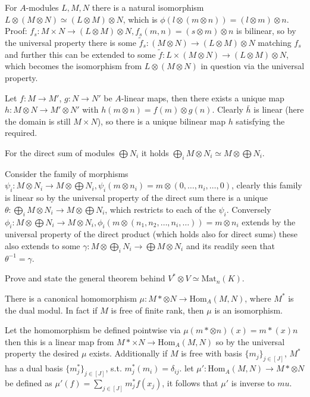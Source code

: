 For \(A\)-modules \(L, M, N\) there is a natural isomorphism
\(L \otimes (M \otimes N) \simeq (L \otimes M) \otimes N\), which is \(\phi(l \otimes (m \otimes n)) = (l \otimes m) \otimes n\).
Proof:
\(f_s : M \times N \to (L \otimes M) \otimes N, f_s(m, n) = (s \otimes m) \otimes n\) is bilinear, so by the universal property there is some
\(\tilde{f}_s : (M \otimes N) \to (L \otimes M) \otimes N\) matching \(f_s\) and further this can be extended to some \(\tilde{f} : L \times (M \otimes N) \to (L \otimes M) \otimes N\), which becomes the isomorphism from \(L \otimes (M \otimes N)\) in question via the universal property.

Let \(f : M \to M'\), \(g : N \to N'\) be \(A\)-linear maps, then there exists a unique map \(h : M \otimes N \to M' \otimes N'\) with \(h(m \otimes n) = f(m) \otimes g(n)\).
Clearly \(\bar{h}\) is linear (here the domain is still \(M \times N\)), so there is a unique bilinear map \(h\) satisfying the required.

For the direct sum of modules \(\bigoplus N_i\) it holds \(\bigoplus_{i} M \otimes N_i \simeq M \otimes \bigoplus N_i\).

Consider the family of morphisms \(\psi_i : M \otimes N_i \to M \otimes \bigoplus N_i, \psi_i (m \otimes n_i) = m \otimes (0, \dots, n_i, \dots, 0)\), clearly this
family is linear so by the universal property of the direct sum there is a unique \(\theta : \bigoplus_{i} M \otimes N_i \to M \otimes \bigoplus N_i\), which restricts to each of the \(\psi_i\). Conversely \(\phi_i : M \otimes \bigoplus N_i \to M \otimes N_i, \phi_i(m \otimes (n_1, n_2, \dots, n_i, \dots)) = m \otimes n_i \) extends
by the universal property of the direct product (which holds also for direct sums) these also extends to some \(\gamma : M \otimes \bigoplus_i N_i \to \bigoplus M \otimes N_i\) and its readily seen that \(\theta^{-1} = \gamma\).



Prove and state the general theorem behind \(V^{*} \otimes V \simeq \text{Mat}_n(K)\).

There is a canonical homomorphism \(\mu : M* \otimes N \to \text{Hom}_A(M, N)\), where \(M^{*}\) is the dual modul.
In fact if \(M\) is free of finite rank, then \(\mu\) is an isomorphism.

Let the homomorphism be defined pointwise via \(\mu(m* \otimes n)(x) = m*(x) n\) then this is a linear map from \(M* \times N \to \text{Hom}_A(M, N)\) so by the universal
property the desired \(\mu\) exists. Additionally if \(M\) is free with basis \(\{m_j\}_{j \in [J]}\), \(M^{*}\) has a dual basis \(\{m^{*}_j\}_{j \in [J]}\), s.t.
\(m^{*}_j(m_i) = \delta_{ij}\). let \(\mu' : \text{Hom}_A(M, N) \to M* \otimes N\) be defined as \(\mu'(f) = \sum_{j \in [J]} m^{*}_j f(x_j)\), it follows that \(\mu'\)
is inverse to \(mu\).


